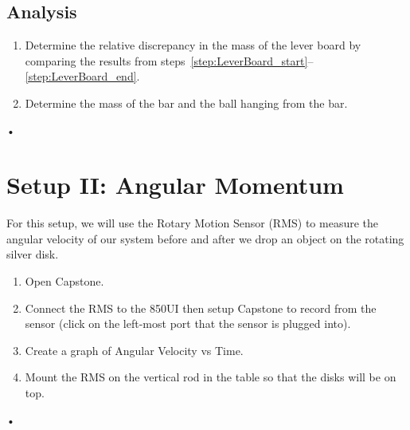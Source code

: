 \documentclass[main.tex]{subfiles}
\begin{document}
\subsection*{Analysis}
\begin{enumerate}
\item
Determine the relative discrepancy in the mass of the lever board by comparing the results from steps~\ref{step:LeverBoard_start}--\ref{step:LeverBoard_end}.
\item
Determine the mass of the bar and the ball hanging from the bar.
\end{enumerate}•

\section{Setup II: Angular Momentum}
For this setup, we will use the Rotary Motion Sensor (RMS) to measure the angular velocity of our system before and after we drop an object on the rotating silver disk.
\begin{enumerate}
\item
Open Capstone.
\item
Connect the RMS to the 850UI then setup Capstone to record from the sensor (click on the left-most port that the sensor is plugged into).
\item
Create a graph of Angular Velocity vs Time.
\item
Mount the RMS on the vertical rod in the table so that the disks will be on top.
\end{enumerate}•
\end{document}
